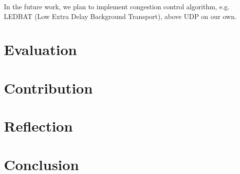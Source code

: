 \documentclass{sig-alternate-10pt}
\begin{document}
In the future work, we plan to implement congestion control algorithm, e.g. LEDBAT (Low Extra Delay Background Transport), above UDP on our own.


\section{Evaluation}

\section{Contribution}

\section{Reflection}

\section{Conclusion}

 

\end{document}
